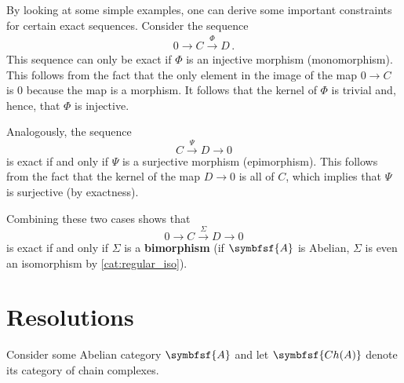 	\begin{property}
		By looking at some simple examples, one can derive some important constraints for certain exact sequences. Consider the sequence
		\begin{gather}
			0\longrightarrow C\overset{\Phi}{\longrightarrow}D\,.
		\end{gather}
		This sequence can only be exact if $\Phi$ is an injective morphism (monomorphism). This follows from the fact that the only element in the image of the map $0\rightarrow C$ is 0 because the map is a morphism. It follows that the kernel of $\Phi$ is trivial and, hence, that $\Phi$ is injective.

		Analogously, the sequence \[C\overset{\Psi}{\longrightarrow}D\longrightarrow0\] is exact if and only if $\Psi$ is a surjective morphism (epimorphism). This follows from the fact that the kernel of the map $D\rightarrow0$ is all of $C$, which implies that $\Psi$ is surjective (by exactness).

		Combining these two cases shows that \[0\longrightarrow C\overset{\Sigma}{\longrightarrow}D\longrightarrow0\] is exact if and only if $\Sigma$ is a \textbf{bimorphism} (if $\symbfsf{A}$ is Abelian, $\Sigma$ is even an isomorphism by \cref{cat:regular_iso}).
	\end{property}

\section{Resolutions}

	Consider some Abelian category $\symbfsf{A}$ and let $\symbfsf{Ch(A)}$ denote its category of chain complexes.



